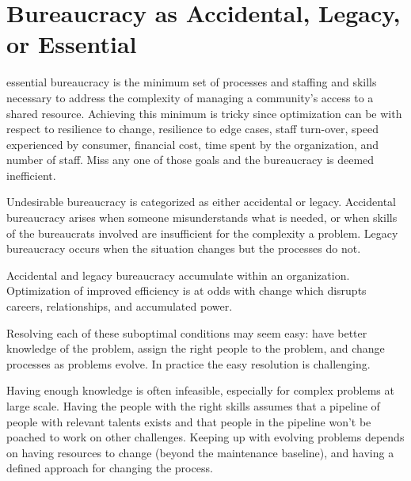 \section{Bureaucracy as Accidental, Legacy, or Essential}
\gls{essential bureaucracy} is the minimum set of processes and staffing and skills necessary to address the complexity of managing a community's access to a \gls{shared resource}. Achieving this minimum is tricky since optimization can be with respect to resilience to change, resilience to edge cases, staff turn-over, speed experienced by consumer, financial cost, time spent by the organization, and number of staff. Miss any one of those goals and the bureaucracy is deemed inefficient.

Undesirable bureaucracy is categorized as either accidental or legacy. Accidental bureaucracy arises when someone misunderstands what is needed, or when skills of the bureaucrats involved are insufficient for the complexity a problem. Legacy bureaucracy occurs when the situation changes but the processes do not. 

Accidental and legacy bureaucracy accumulate within an organization. Optimization of improved efficiency is at odds with change which disrupts careers, relationships, and accumulated power. 

Resolving each of these suboptimal conditions may seem easy: have better knowledge of the problem, assign the right people to the problem, and change processes as problems evolve.  In practice the easy resolution is challenging. 

Having enough knowledge is often infeasible, especially for complex problems at large scale. Having the people with the right skills assumes that a pipeline of people with relevant talents exists and that people in the pipeline won't be poached to work on other challenges. Keeping up with evolving problems depends on having resources to change (beyond the maintenance baseline), and having a defined approach for changing the process. 